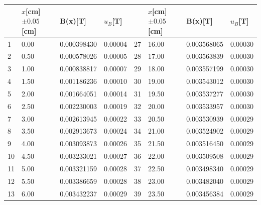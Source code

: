 \documentclass[12pt, a4paper]{article}
\begin{document}
\begin{table}[H]
	\begin{center}
	\begin{tabular}{|l|l|l|l|l|l|l|l|}
	\hline
	   & $x${[}cm{]}$\pm 0.05${[}cm{]} & B(x){[}T{]} & $u_B${[}T{]} &    & $x${[}cm{]}$\pm 0.05${[}cm{]} & B(x){[}T{]} & $u_B${[}T{]} \\ \hline
	1  & 0.00                          & 0.000398430 & 0.00004      & 27 & 16.00                         & 0.003568065 & 0.00030      \\ \hline
	2  & 0.50                          & 0.000578026 & 0.00005      & 28 & 17.00                         & 0.003563839 & 0.00030      \\ \hline
	3  & 1.00                          & 0.000838817 & 0.00007      & 29 & 18.00                         & 0.003557199 & 0.00030      \\ \hline
	4  & 1.50                          & 0.001186236 & 0.00010      & 30 & 19.00                         & 0.003543012 & 0.00030      \\ \hline
	5  & 2.00                          & 0.001664051 & 0.00014      & 31 & 19.50                         & 0.003537277 & 0.00030      \\ \hline
	6  & 2.50                          & 0.002230003 & 0.00019      & 32 & 20.00                         & 0.003533957 & 0.00030      \\ \hline
	7  & 3.00                          & 0.002613945 & 0.00022      & 33 & 20.50                         & 0.003530939 & 0.00029      \\ \hline
	8  & 3.50                          & 0.002913673 & 0.00024      & 34 & 21.00                         & 0.003524902 & 0.00029      \\ \hline
	9  & 4.00                          & 0.003093873 & 0.00026      & 35 & 21.50                         & 0.003516450 & 0.00029      \\ \hline
	10 & 4.50                          & 0.003233021 & 0.00027      & 36 & 22.00                         & 0.003509508 & 0.00029      \\ \hline
	11 & 5.00                          & 0.003321159 & 0.00028      & 37 & 22.50                         & 0.003498340 & 0.00029      \\ \hline
	12 & 5.50                          & 0.003386659 & 0.00028      & 38 & 23.00                         & 0.003482040 & 0.00029      \\ \hline
	13 & 6.00                          & 0.003432237 & 0.00029      & 39 & 23.50                         & 0.003456384 & 0.00029      \\ \hline

\end{tabular}
\end{center}
\end{table}
\end{document}
